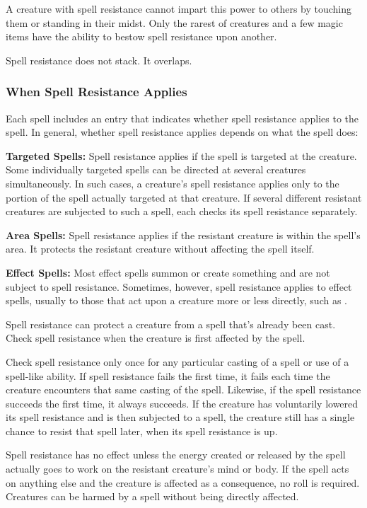 A creature with spell resistance cannot impart this power to others by touching 
them or standing in their midst. Only the rarest of creatures and a few magic items 
have the ability to bestow spell resistance upon another.

Spell resistance does not stack. It overlaps. 

\subsubsection{When Spell Resistance Applies}

Each spell includes an entry that indicates whether spell resistance applies to 
the spell. In general, whether spell resistance applies depends on what the spell 
does:

\textbf{Targeted Spells:} Spell resistance applies if the spell is targeted at 
the creature. Some individually targeted spells can be directed at several creatures 
simultaneously. In such cases, a creature's spell resistance applies only to the 
portion of the spell actually targeted at that creature. If several different resistant 
creatures are subjected to such a spell, each checks its spell resistance separately.

\textbf{Area Spells:} Spell resistance applies if the resistant creature is within 
the spell's area. It protects the resistant creature without affecting the spell 
itself.

\textbf{Effect Spells:} Most effect spells summon or create something and are not 
subject to spell resistance. Sometimes, however, spell resistance applies to effect 
spells, usually to those that act upon a creature more or less directly, such as 
.

Spell resistance can protect a creature from a spell that's already been cast. 
Check spell resistance when the creature is first affected by the spell.

Check spell resistance only once for any particular casting of a spell or use of 
a spell-like ability. If spell resistance fails the first time, it fails each time 
the creature encounters that same casting of the spell. Likewise, if the spell 
resistance succeeds the first time, it always succeeds. If the creature has voluntarily 
lowered its spell resistance and is then subjected to a spell, the creature still 
has a single chance to resist that spell later, when its spell resistance is up.

Spell resistance has no effect unless the energy created or released by the spell 
actually goes to work on the resistant creature's mind or body. If the spell acts 
on anything else and the creature is affected as a consequence, no roll is required. 
Creatures can be harmed by a spell without being directly affected. 

